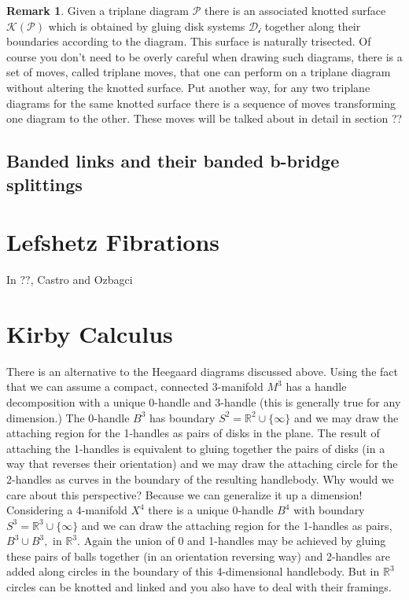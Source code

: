 \documentclass{amsart}
\theoremstyle{definition}
\newtheorem{remark}[theorem]{Remark}
\begin{document}
\begin{remark}
Given a triplane diagram $\mathcal{P}$ there is an associated knotted surface $\mathcal{K}(\mathcal{P})$ which is obtained by gluing disk systems $\mathcal{D_{i}}$ together along their boundaries according to the diagram. This surface is naturally trisected. Of course you don't need to be overly careful when drawing such diagrams, there is a set of moves, called triplane moves, that one can perform on a triplane diagram without altering the knotted surface. Put another way, for any two triplane diagrams for the same knotted surface there is a sequence of moves transforming one diagram to the other. These moves will be talked about in detail in section ??
\end{remark}

\subsection{Banded links and their banded b-bridge splittings}

\section{Lefshetz Fibrations}
In ??, Castro and Ozbagci

\section{Kirby Calculus}
There is an alternative to the Heegaard diagrams discussed above. Using the fact that we can assume a compact, connected 3-manifold $M^{3}$ has a handle decomposition with a unique 0-handle and 3-handle (this is generally true for any dimension.) The 0-handle $B^{3}$ has boundary $S^{2} = \mathbb{R}^{2} \cup \{\infty\}$ and we may draw the attaching region for the 1-handles as pairs of disks in the plane. The result of attaching the 1-handles is equivalent to gluing together the pairs of disks (in a way that reverses their orientation) and we may draw the attaching circle for the 2-handles as curves in the boundary of the resulting handlebody. \newline \newline Why would we care about this perspective? Because we can generalize it up a dimension! Considering a 4-manifold $X^{4}$ there is a unique 0-handle $B^{4}$ with boundary $S^{3} = \mathbb{R}^{3} \cup \{\infty\}$ and we can draw the attaching region for the 1-handles as pairs, $B^{3} \cup B^{3},$ in $\mathbb{R}^{3}.$ Again the union of 0 and 1-handles may be achieved by gluing these pairs of balls together (in an orientation reversing way) and 2-handles are added along circles in the boundary of this 4-dimensional handlebody. But in $\mathbb{R}^{3}$ circles can be knotted and linked and you also have to deal with their framings.
\end{document}
